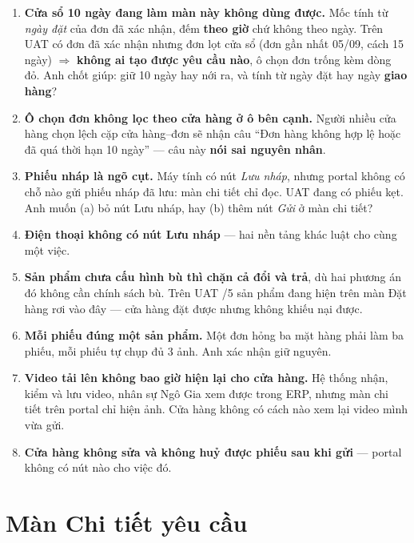 \begin{ask}
\begin{enumerate}[leftmargin=*]
  \item \textbf{Cửa sổ 10 ngày đang làm màn này không dùng được.} Mốc tính từ \emph{ngày đặt}
        của đơn đã xác nhận, đếm \textbf{theo giờ} chứ không theo ngày. Trên UAT có  đơn
        đã xác nhận nhưng  đơn lọt cửa sổ (đơn gần nhất 05/09, cách 15 ngày)
        $\Rightarrow$ \textbf{không ai tạo được yêu cầu nào}, ô chọn đơn trống kèm dòng đỏ.
        Anh chốt giúp: giữ 10 ngày hay nới ra, và tính từ ngày đặt hay ngày \textbf{giao hàng}?
  \item \textbf{Ô chọn đơn không lọc theo cửa hàng ở ô bên cạnh.} Người nhiều cửa hàng chọn
        lệch cặp cửa hàng--đơn sẽ nhận câu ``Đơn hàng không hợp lệ hoặc đã quá thời hạn 10
        ngày'' --- câu này \textbf{nói sai nguyên nhân}.
  \item \textbf{Phiếu nháp là ngõ cụt.} Máy tính có nút \emph{Lưu nháp}, nhưng portal không có
        chỗ nào gửi phiếu nháp đã lưu: màn chi tiết chỉ đọc. UAT đang có  phiếu kẹt.
        Anh muốn (a) bỏ nút Lưu nháp, hay (b) thêm nút \emph{Gửi} ở màn chi tiết?
  \item \textbf{Điện thoại không có nút Lưu nháp} --- hai nền tảng khác luật cho cùng một việc.
  \item \textbf{Sản phẩm chưa cấu hình bù thì chặn cả đổi và trả}, dù hai phương án đó không
        cần chính sách bù. Trên UAT /5 sản phẩm đang hiện trên màn Đặt hàng rơi vào đây
        --- cửa hàng đặt được nhưng không khiếu nại được.
  \item \textbf{Mỗi phiếu đúng một sản phẩm.} Một đơn hỏng ba mặt hàng phải làm ba phiếu, mỗi
        phiếu tự chụp đủ 3 ảnh. Anh xác nhận giữ nguyên.
  \item \textbf{Video tải lên không bao giờ hiện lại cho cửa hàng.} Hệ thống nhận, kiểm và lưu
        video, nhân sự Ngô Gia xem được trong ERP, nhưng màn chi tiết trên portal chỉ hiện ảnh.
        Cửa hàng không có cách nào xem lại video mình vừa gửi.
  \item \textbf{Cửa hàng không sửa và không huỷ được phiếu sau khi gửi} --- portal không có nút
        nào cho việc đó.
\end{enumerate}
\end{ask}

\section{Màn Chi tiết yêu cầu}
\medskip

